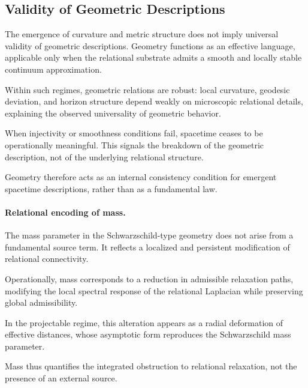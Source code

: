 \subsection{Validity of Geometric Descriptions}
  \label{subsec:validity-of-geometry}

  The emergence of curvature and metric structure does not imply
  universal validity of geometric descriptions.
  Geometry functions as an effective language,
  applicable only when the relational substrate admits
  a smooth and locally stable continuum approximation.

  Within such regimes, geometric relations are robust:
  local curvature, geodesic deviation, and horizon structure
  depend weakly on microscopic relational details,
  explaining the observed universality of geometric behavior.

  When injectivity or smoothness conditions fail,
  spacetime ceases to be operationally meaningful.
  This signals the breakdown of the geometric description,
  not of the underlying relational structure.

  Geometry therefore acts as an internal consistency condition
  for emergent spacetime descriptions,
  rather than as a fundamental law.

  \paragraph{Relational encoding of mass.}

    The mass parameter in the Schwarzschild-type geometry
    does not arise from a fundamental source term.
    It reflects a localized and persistent modification
    of relational connectivity.

    Operationally, mass corresponds to a reduction in
    admissible relaxation paths,
    modifying the local spectral response of the relational Laplacian
    while preserving global admissibility.

    In the projectable regime,
    this alteration appears as a radial deformation of effective distances,
    whose asymptotic form reproduces the Schwarzschild mass parameter.

    Mass thus quantifies the integrated obstruction to relational relaxation,
    not the presence of an external source.
